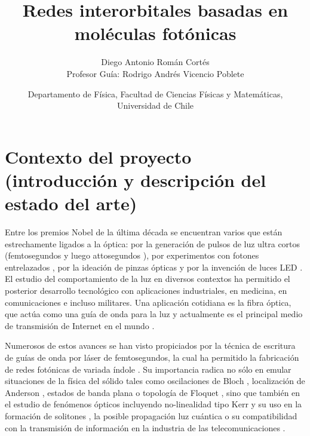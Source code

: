\documentclass{article}
\author{Diego Antonio Román Cortés\\Profesor Guía: Rodrigo Andrés Vicencio Poblete}
\date{Departamento de Física, Facultad de Ciencias Físicas y Matemáticas, Universidad de Chile}
\title{Redes interorbitales basadas en moléculas fotónicas}
\begin{document}
 \maketitle

\section{Contexto del proyecto (introducción y descripción del estado del arte)}

Entre los premios Nobel de la última década \cite{nobel} se encuentran varios que están estrechamente ligados a la óptica: por la generación de pulsos de luz ultra cortos (femtosegundos \cite{femto1} y luego attosegundos \cite{atto1, atto2, atto3}), por experimentos con fotones entrelazados \cite{photons1, photons2, photons3}, por la ideación de pinzas ópticas \cite{opticaltweezers} y por la invención de luces LED \cite{led1, led2, led3}. El estudio del comportamiento de la luz en diversos contextos ha permitido el posterior desarrollo tecnológico con aplicaciones industriales, en medicina, en comunicaciones e incluso militares. Una aplicación cotidiana es la fibra óptica, que actúa como una guía de onda para la luz y actualmente es el principal medio de transmisión de Internet en el mundo \cite{fibra2, fibra}. 
	
	Numerosos de estos avances se han visto propiciados por la técnica de escritura de guías de onda por láser de femtosegundos, la cual ha permitido la fabricación de redes fotónicas de variada índole \cite{femto, bics, lieb1, lieb2, artificialFB, FBdynamics, dendritas, splitters}. Su importancia radica no sólo en emular situaciones de la física del sólido tales como oscilaciones de Bloch \cite{BlochOsci}, localización de Anderson \cite{Anderson}, estados de banda plana \cite{lieb1, lieb2, artificialFB, FBdynamics} o topología de Floquet \cite{obstopo, obsfloquet}, sino que también en el estudio de fenómenos ópticos incluyendo no-linealidad tipo Kerr y su uso en la formación de solitones \cite{discretesolitons}, la posible propagación luz cuántica \cite{qed, squeezed, topoquantum} o su compatibilidad con la transmisión de información en la industria de las telecomunicaciones \cite{telecom}.
	
\end{document}
